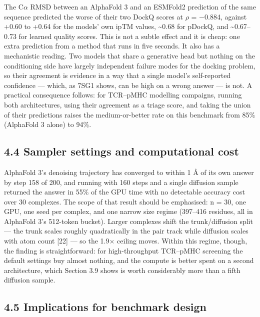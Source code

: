 \documentclass[
  11pt,
]{article}
\begin{document}
The C\ensuremath{\alpha} RMSD between an AlphaFold 3 and an ESMFold2 prediction of the
same sequence predicted the worse of their two DockQ scores at \ensuremath{\rho} =
\ensuremath{-}0.884, against +0.60 to +0.64 for the models' own ipTM values,
\textasciitilde0.68 for pDockQ, and \textasciitilde0.67--0.73 for
learned quality scores. This is not a subtle effect and it is cheap: one
extra prediction from a method that runs in five seconds. It also has a
mechanistic reading. Two models that share a generative head but nothing
on the conditioning side have largely independent failure modes for the
docking problem, so their agreement is evidence in a way that a single
model's self-reported confidence --- which, as 7SG1 shows, can be high
on a wrong answer --- is not. A practical consequence follows: for
TCR--pMHC modelling campaigns, running both architectures, using their
agreement as a triage score, and taking the union of their predictions
raises the medium-or-better rate on this benchmark from 85\% (AlphaFold
3 alone) to 94\%.

\subsection{4.4 Sampler settings and computational
cost}\label{sampler-settings-and-computational-cost}

AlphaFold 3's denoising trajectory has converged to within 1 \AA{} of its
own answer by step 158 of 200, and running with 160 steps and a single
diffusion sample returned the answer in 55\% of the GPU time with no
detectable accuracy cost over 30 complexes. The scope of that result
should be emphasised: n = 30, one GPU, one seed per complex, and one
narrow size regime (397--416 residues, all in AlphaFold 3's 512-token
bucket). Larger complexes shift the trunk/diffusion split --- the trunk
scales roughly quadratically in the pair track while diffusion scales
with atom count {[}22{]} --- so the 1.9\ensuremath{\times} ceiling moves. Within this regime,
though, the finding is straightforward: for high-throughput TCR--pMHC
screening the default settings buy almost nothing, and the compute is
better spent on a second architecture, which Section 3.9 shows is worth
considerably more than a fifth diffusion sample.

\subsection{4.5 Implications for benchmark
design}\label{implications-for-benchmark-design}
\end{document}
